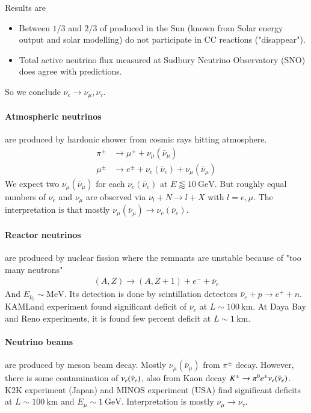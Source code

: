 Results are
\begin{itemize}
   \item Between $1/3$ and $2/3$ of produced in the Sun (known from Solar energy output and solar modelling) do not participate in CC reactions ("disappear").
   \item Total active neutrino flux measured at Sudbury Neutrino Observatory (SNO) does agree with predictions.
\end{itemize}
So we conclude $\nu_e \rightarrow \nu_\mu, \nu_\tau$.

\paragraph{Atmospheric neutrinos} are produced by hardonic shower from cosmic rays hitting atmosphere. 
\begin{align}
   \pi^\pm &\rightarrow \mu^\pm + \nu_\mu (\bar{\nu}_\mu) \\
   \mu^\pm &\rightarrow e^\pm + \nu_e(\bar{\nu}_e) + \nu_\mu(\bar{\nu}_\mu)
\end{align}
We expect two $\nu_\mu (\bar{\nu}_\mu)$ for each $\nu_e (\bar{\nu}_e)$ at $E \lessapprox \SI{10}{\giga \eV}$. But roughly equal numbers of $\nu_e$ and $\nu_\mu$ are observed via $\nu_l + N \rightarrow l + X$ with $l=e,\mu$. The interpretation is that mostly $\nu_\mu (\bar{\nu}_\mu) \rightarrow \nu_e (\bar{\nu}_e)$.

\paragraph{Reactor neutrinos} are produced by nuclear fission where the remnants are unstable because of "too many neutrons"
\begin{align}
   (A,Z) \rightarrow (A, Z+1) + e^- + \bar{\nu}_e 
\end{align}
And $E_{\bar{\nu}_e} \sim \si{\mega \eV}$. Its detection is done by scintillation detectors $\bar{\nu}_e + p \rightarrow e^+ + n$. KAMLand experiment found significant deficit of $\bar{\nu}_e$ at $L \sim \SI{100}{\kilo \m}$. At Daya Bay and Reno experiments, it is found few percent deficit at $L\sim \SI{1}{\kilo\m}$.

\paragraph{Neutrino beams} are produced by meson beam decay. Mostly $\nu_\mu (\bar{\nu}_\mu)$ from $\pi^\pm$ decay. However, there is some contamination of $\nu_e (\bar{\nu}_e)$, also from Kaon decay $K^\pm \rightarrow \pi^0 e^\pm \nu_e (\bar{\nu}_e) $. K2K experiment (Japan) and MINOS experiment (USA) find significant deficits at $L\sim \SI{100}{\kilo\m}$ and $E_\mu \sim \SI{1}{\giga \eV}$. Interpretation is mostly $\nu_\mu \rightarrow \nu_\tau$.

